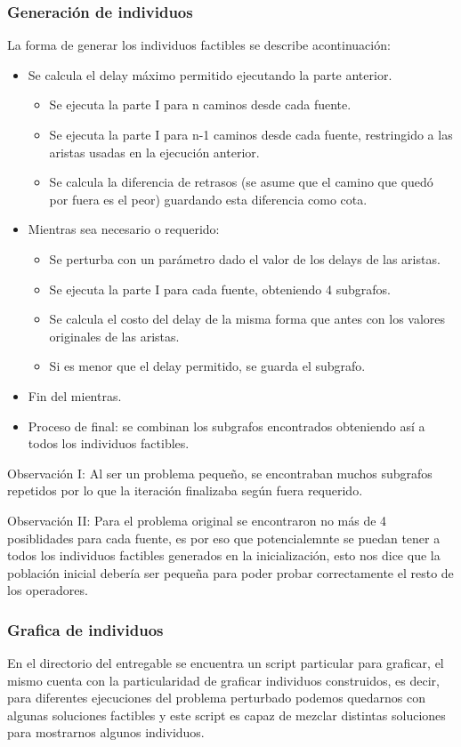 \documentclass{extarticle}
\begin{document}
\subsubsection{Generación de individuos}
La forma de generar los individuos factibles se describe acontinuación:
\begin{itemize}
	\item Se calcula el delay máximo permitido ejecutando la parte anterior.
	\begin{itemize}
		\item Se ejecuta la parte I para n caminos desde cada fuente.
		\item Se ejecuta la parte I para n-1 caminos desde cada fuente, restringido a las aristas usadas en la ejecución anterior.
		\item Se calcula la diferencia de retrasos (se asume que el camino que quedó por fuera es el peor) guardando esta diferencia como cota.
	\end{itemize}
	\item  Mientras sea necesario o requerido:
	\begin{itemize}
		\item Se perturba con un parámetro dado el valor de los delays de las aristas.
		\item Se ejecuta la parte I para cada fuente, obteniendo 4 subgrafos.
		\item Se calcula el costo del delay de la misma forma que antes con los valores originales de las aristas.
		 \item Si es menor que el delay permitido, se guarda el subgrafo.
	\end{itemize}
	\item Fin del mientras.
	\item Proceso de final: se combinan los subgrafos encontrados obteniendo así a todos los individuos factibles.
\end{itemize}

Observación I: Al ser un problema pequeño, se encontraban muchos subgrafos repetidos por lo que la iteración finalizaba según fuera requerido.

Observación II: Para el problema original se encontraron no más de 4 posiblidades para cada fuente, es por eso que potencialemnte se puedan tener a todos los individuos factibles generados en la inicialización, esto nos dice que la población inicial debería ser pequeña para poder probar correctamente el resto de los operadores.

\subsubsection{Grafica de individuos}
En el directorio del entregable se encuentra un script particular para graficar, el mismo cuenta con la particularidad de graficar individuos construidos, es decir, para diferentes ejecuciones del problema perturbado podemos quedarnos con algunas soluciones factibles y este script es capaz de mezclar distintas soluciones para mostrarnos algunos individuos. 
\end{document}
